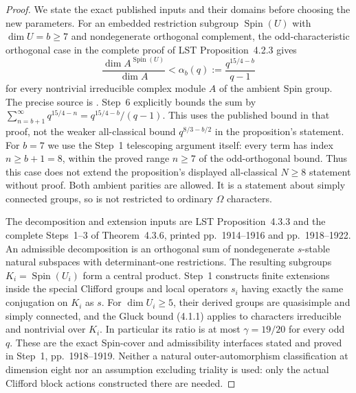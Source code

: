 \begin{proof}
We state the exact published inputs and their domains before
choosing the new parameters.
For an embedded restriction subgroup $\operatorname{Spin}(U)$
with $\dim U=b\ge7$ and nondegenerate orthogonal complement,
the odd-characteristic orthogonal case in the complete proof
of LST Proposition~4.2.3 gives
\[
 \frac{\dim A^{\operatorname{Spin}(U)}}{\dim A}
       <\alpha_b(q):=\frac{q^{15/4-b}}{q-1}
 \tag{SPO.9}
\]
for every nontrivial irreducible complex module $A$ of the
ambient Spin group.  The precise source is
\cite[Proposition~4.2.3, pp.~1909--1912, its odd-orthogonal
case in Step~1 and the $s=1$ summation in Step~6, p.~1912]{HOS:LST2011}.
Step~6 explicitly bounds the sum by
$\sum_{n=b+1}^{\infty}q^{15/4-n}=q^{15/4-b}/(q-1)$.
This uses the published bound in that proof, not the weaker
all-classical bound $q^{8/3-b/2}$ in the proposition's statement.
For $b=7$ we use the Step~1 telescoping argument itself:
every term has index $n\ge b+1=8$, within the proved range
$n\ge7$ of the odd-orthogonal bound.  Thus this case does not
extend the proposition's displayed all-classical $N\ge8$
statement without proof.  Both ambient parities are allowed.
It is a statement about
simply connected groups, so is not restricted to ordinary
$\Omega$ characters.

The decomposition and extension inputs are LST
Proposition~4.3.3 and the complete Steps~1--3 of Theorem~4.3.6,
printed pp.~1914--1916 and pp.~1918--1922.
An admissible decomposition is an orthogonal sum of nondegenerate
$s$-stable natural subspaces with determinant-one restrictions.
The resulting subgroups $K_i=\operatorname{Spin}(U_i)$ form a
central product.  Step~1 constructs finite extensions inside
the special Clifford groups and local operators $s_i$ having
exactly the same conjugation on $K_i$ as $s$.
For $\dim U_i\ge5$, their derived groups are quasisimple and
simply connected, and the Gluck bound (4.1.1) applies to
characters irreducible and nontrivial over $K_i$.
In particular its ratio is at most $\gamma=19/20$ for every
odd $q$.  These are the exact Spin-cover and admissibility
interfaces stated and proved in Step~1, pp.~1918--1919.
Neither a natural outer-automorphism classification at dimension
eight nor an assumption excluding triality is used: only the
actual Clifford block actions constructed there are needed.


\end{proof}
